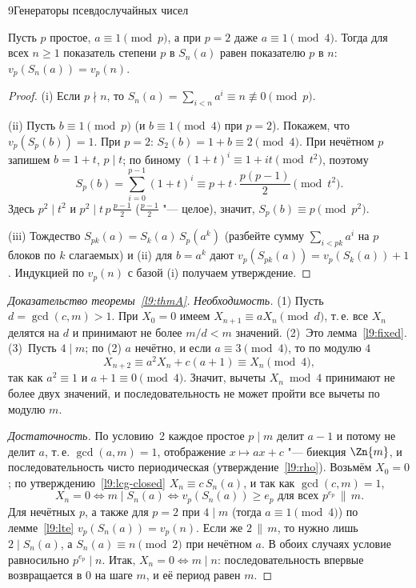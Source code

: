 \begin{lecture}{9}{Генераторы псевдослучайных чисел}
\begin{lemma}\label{l9:lte}
Пусть $p$ простое, $a \equiv 1 \pmod p$, а при $p = 2$ даже $a \equiv 1 \pmod 4$. Тогда для всех
$n \ge 1$ показатель степени $p$ в $S_n(a)$ равен показателю $p$ в $n$: $v_p(S_n(a)) = v_p(n)$.
\end{lemma}

\begin{proof}
(i) Если $p \nmid n$, то $S_n(a) = \sum_{i<n} a^i \equiv n \not\equiv 0 \pmod p$.

(ii) Пусть $b \equiv 1 \pmod p$ (и $b \equiv 1 \pmod 4$ при $p = 2$). Покажем, что
$v_p(S_p(b)) = 1$. При $p = 2$: $S_2(b) = 1 + b \equiv 2 \pmod 4$. При нечётном $p$ запишем
$b = 1 + t$, $p \mid t$; по биному $(1 + t)^i \equiv 1 + it \pmod{t^2}$, поэтому
\[
  S_p(b) = \sum_{i=0}^{p-1} (1 + t)^i \equiv p + t \cdot \frac{p(p-1)}{2} \pmod{t^2}.
\]
Здесь $p^2 \mid t^2$ и $p^2 \mid t\,p\,\frac{p - 1}{2}$ ($\frac{p - 1}{2}$ "--- целое), значит,
$S_p(b) \equiv p \pmod{p^2}$.

(iii) Тождество $S_{pk}(a) = S_k(a)\, S_p(a^k)$ (разбейте сумму $\sum_{i < pk} a^i$ на $p$ блоков по
$k$ слагаемых) и (ii) для $b = a^k$ дают $v_p(S_{pk}(a)) = v_p(S_k(a)) + 1$. Индукцией по $v_p(n)$
с базой (i) получаем утверждение.
\end{proof}

\begin{proof}[Доказательство теоремы~\ref{l9:thmA}]
\emph{Необходимость.} (1) Пусть $d = \gcd(c, m) > 1$. При $X_0 = 0$ имеем
$X_{n+1} \equiv a X_n \pmod d$, т.\,е. все $X_n$ делятся на $d$ и принимают не более $m/d < m$
значений. (2)~Это лемма~\ref{l9:fixed}. (3)~Пусть $4 \mid m$; по (2) $a$ нечётно, и если
$a \equiv 3 \pmod 4$, то по модулю $4$
\[
  X_{n+2} \equiv a^2 X_n + c(a + 1) \equiv X_n \pmod 4,
\]
так как $a^2 \equiv 1$ и $a + 1 \equiv 0 \pmod 4$. Значит, вычеты $X_n \bmod 4$ принимают не более
двух значений, и последовательность не может пройти все вычеты по модулю $m$.

\emph{Достаточность.} По условию~2 каждое простое $p \mid m$ делит $a - 1$ и потому не делит $a$,
т.\,е. $\gcd(a, m) = 1$, отображение $x \mapsto ax + c$ "--- биекция $\Zn{m}$, и последовательность
чисто периодическая (утверждение~\ref{l9:rho}). Возьмём $X_0 = 0$; по
утверждению~\ref{l9:lcg-closed} $X_n \equiv c\, S_n(a)$, и так как $\gcd(c, m) = 1$,
\[
  X_n = 0 \iff m \mid S_n(a) \iff v_p(S_n(a)) \ge e_p \text{ для всех } p^{e_p} \,\|\, m.
\]
Для нечётных $p$, а также для $p = 2$ при $4 \mid m$ (тогда $a \equiv 1 \pmod 4$) по
лемме~\ref{l9:lte} $v_p(S_n(a)) = v_p(n)$. Если же $2 \,\|\, m$, то нужно лишь
$2 \mid S_n(a)$, а $S_n(a) \equiv n \pmod 2$ при нечётном $a$. В обоих случаях условие
равносильно $p^{e_p} \mid n$. Итак, $X_n = 0 \iff m \mid n$: последовательность впервые
возвращается в $0$ на шаге $m$, и её период равен $m$.
\end{proof}


\end{lecture}
